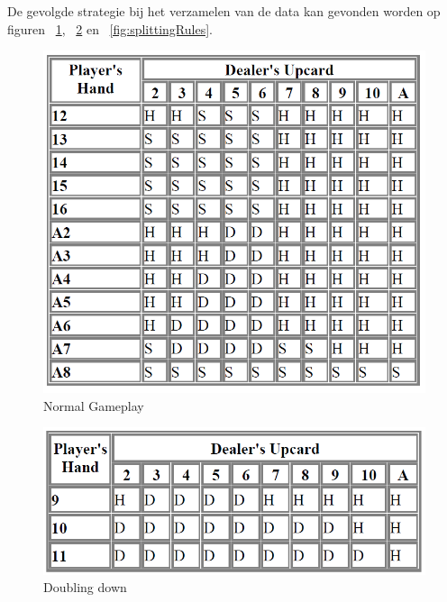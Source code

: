 \documentclass[conference]{IEEEtran}
\begin{document}
De gevolgde strategie bij het verzamelen van de data kan gevonden worden op figuren ~\ref{fig:normalgameplaying}, ~\ref{fig:doublingDown} en ~\ref{fig:splittingRules}.

\begin{figure}[H]
	\includegraphics[width=\linewidth]{img/ThorpeNormal}
  	\caption{Normal Gameplay}
  	\label{fig:normalgameplaying}
\end{figure}
\begin{figure}[H]
	\includegraphics[width=\linewidth]{img/doubleDown}
  	\caption{Doubling down}
  	\label{fig:doublingDown}
\end{figure}
\end{document}
